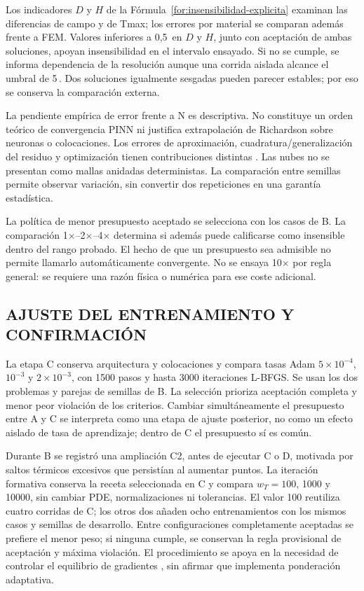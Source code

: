 Los indicadores $D$ y $H$ de la Fórmula~\ref{for:insensibilidad-explicita} examinan las diferencias de campo y de Tmax; los errores por material se comparan además frente a FEM. Valores inferiores a 0,5\,\pct{} en $D$ y $H$, junto con aceptación de ambas soluciones, apoyan insensibilidad en el intervalo ensayado. Si no se cumple, se informa dependencia de la resolución aunque una corrida aislada alcance el umbral de 5\,\pct{}. Dos soluciones igualmente sesgadas pueden parecer estables; por eso se conserva la comparación externa.

La pendiente empírica de error frente a N es descriptiva. No constituye un orden teórico de convergencia PINN ni justifica extrapolación de Richardson sobre neuronas o colocaciones. Los errores de aproximación, cuadratura/generalización del residuo y optimización tienen contribuciones distintas \parencites{deryck2024analysis}{mishra2020error}. Las nubes no se presentan como mallas anidadas deterministas. La comparación entre semillas permite observar variación, sin convertir dos repeticiones en una garantía estadística.

La política de menor presupuesto aceptado se selecciona con los casos de B. La comparación 1×--2×--4× determina si además puede calificarse como insensible dentro del rango probado. El hecho de que un presupuesto sea admisible no permite llamarlo automáticamente convergente. No se ensaya 10× por regla general: se requiere una razón física o numérica para ese coste adicional.

\subsection{AJUSTE DEL ENTRENAMIENTO Y CONFIRMACIÓN}

La etapa C conserva arquitectura y colocaciones y compara tasas Adam $5\times10^{-4}$, $10^{-3}$ y $2\times10^{-3}$, con 1500 pasos y hasta 3000 iteraciones L-BFGS. Se usan los dos problemas y parejas de semillas de B. La selección prioriza aceptación completa y menor peor violación de los criterios. Cambiar simultáneamente el presupuesto entre A y C se interpreta como una etapa de ajuste posterior, no como un efecto aislado de tasa de aprendizaje; dentro de C el presupuesto sí es común.

Durante B se registró una ampliación C2, antes de ejecutar C o D, motivada por saltos térmicos excesivos que persistían al aumentar puntos. La iteración formativa conserva la receta seleccionada en C y compara $w_T=100$, 1000 y 10000, sin cambiar PDE, normalizaciones ni tolerancias. El valor 100 reutiliza cuatro corridas de C; los otros dos añaden ocho entrenamientos con los mismos casos y semillas de desarrollo. Entre configuraciones completamente aceptadas se prefiere el menor peso; si ninguna cumple, se conservan la regla provisional de aceptación y máxima violación. El procedimiento se apoya en la necesidad de controlar el equilibrio de gradientes \parencite{wang2020gradients}, sin afirmar que implementa ponderación adaptativa.

